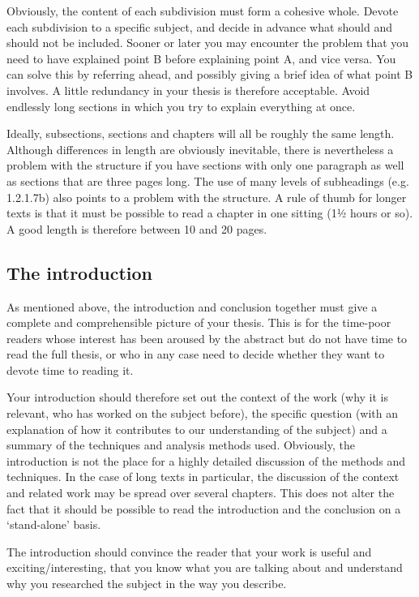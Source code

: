 Obviously, the content of each subdivision must form a cohesive whole. Devote each subdivision to a specific subject, and decide in advance what should and should not be included. Sooner or later you may encounter the problem that you need to have explained point B before explaining point A, and vice versa. You can solve this by referring ahead, and possibly giving a brief idea of what point B involves. A little redundancy in your thesis is therefore acceptable. Avoid endlessly long sections in which you try to explain everything at once.

Ideally, subsections, sections and chapters will all be roughly the same length. Although differences in length are obviously inevitable, there is nevertheless a problem with the structure if you have sections with only one paragraph as well as sections that are three pages long. The use of many levels of  subheadings (e.g. 1.2.1.7b) also points to a problem with the structure. A rule of thumb for longer texts is that it must be possible to read a chapter in one sitting (1½ hours or so). A good length is therefore between 10 and 20 pages.

\subsection{The introduction}\label{sec:_the_introduction}
As mentioned above, the introduction and conclusion together must give a complete and comprehensible picture of your thesis. This is for the time-poor readers whose interest has been aroused by the abstract but do not have time to read the full thesis, or who in any case need to decide whether they want to devote time to reading it.

Your introduction should therefore set out the context of the work (why it is relevant, who has worked on the subject before), the specific question (with an explanation of how it contributes to our understanding of the subject) and a summary of the techniques and analysis methods used. Obviously, the introduction is not the place for a highly detailed discussion of the methods and techniques. In the case of long texts in particular, the discussion of the context and related work may be spread over several chapters. This does not alter the fact that it should be possible to read the introduction and the conclusion on a `stand-alone' basis.

The introduction should convince the reader that your work is useful and exciting/interesting, that you know what you are talking about and understand why you researched the subject in the way you describe.

